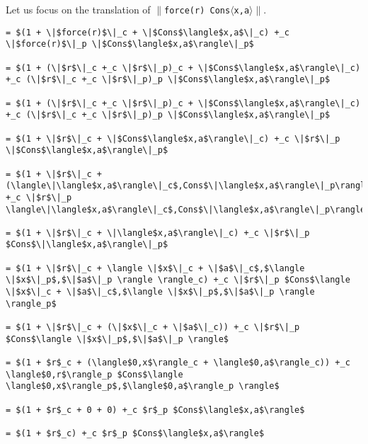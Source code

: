 \documentclass[12pt,letterpaper]{article}
\begin{document}
Let us focus on the translation of \texttt{$\|$force(r) Cons$\langle$x,a$\rangle\|$}.
\begin{lstlisting}
= $(1 + \|$force(r)$\|_c + \|$Cons$\langle$x,a$\|_c) +_c \|$force(r)$\|_p \|$Cons$\langle$x,a$\rangle\|_p$

= $(1 + (\|$r$\|_c +_c \|$r$\|_p)_c + \|$Cons$\langle$x,a$\rangle\|_c) +_c (\|$r$\|_c +_c \|$r$\|_p)_p \|$Cons$\langle$x,a$\rangle\|_p$

= $(1 + (\|$r$\|_c +_c \|$r$\|_p)_c + \|$Cons$\langle$x,a$\rangle\|_c) +_c (\|$r$\|_c +_c \|$r$\|_p)_p \|$Cons$\langle$x,a$\rangle\|_p$

= $(1 + \|$r$\|_c + \|$Cons$\langle$x,a$\rangle\|_c) +_c \|$r$\|_p \|$Cons$\langle$x,a$\rangle\|_p$

= $(1 + \|$r$\|_c + (\langle\|\langle$x,a$\rangle\|_c$,Cons$\|\langle$x,a$\rangle\|_p\rangle)_c) +_c \|$r$\|_p \langle\|\langle$x,a$\rangle\|_c$,Cons$\|\langle$x,a$\rangle\|_p\rangle_p$

= $(1 + \|$r$\|_c + \|\langle$x,a$\rangle\|_c) +_c \|$r$\|_p $Cons$\|\langle$x,a$\rangle\|_p$

= $(1 + \|$r$\|_c + \langle \|$x$\|_c + \|$a$\|_c$,$\langle \|$x$\|_p$,$\|$a$\|_p \rangle \rangle_c) +_c \|$r$\|_p $Cons$\langle \|$x$\|_c + \|$a$\|_c$,$\langle \|$x$\|_p$,$\|$a$\|_p \rangle \rangle_p$

= $(1 + \|$r$\|_c + (\|$x$\|_c + \|$a$\|_c)) +_c \|$r$\|_p $Cons$\langle \|$x$\|_p$,$\|$a$\|_p \rangle$

= $(1 + $r$_c + (\langle$0,x$\rangle_c + \langle$0,a$\rangle_c)) +_c \langle$0,r$\rangle_p $Cons$\langle \langle$0,x$\rangle_p$,$\langle$0,a$\rangle_p \rangle$

= $(1 + $r$_c + 0 + 0) +_c $r$_p $Cons$\langle$x,a$\rangle$

= $(1 + $r$_c) +_c $r$_p $Cons$\langle$x,a$\rangle$
\end{lstlisting}
\end{document}
